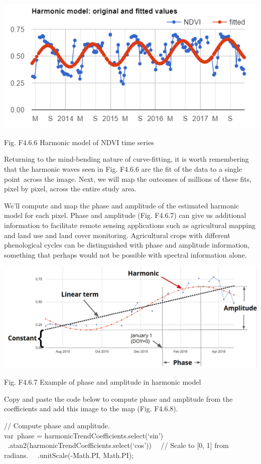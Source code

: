 \documentclass[
  letterpaper,
  DIV=11,
  numbers=noendperiod]{scrreprt}
\begin{document}
\includegraphics{./F4/image86.png}

Fig. F4.6.6 Harmonic model of NDVI time series

Returning to the mind-bending nature of curve-fitting, it is worth
remembering that the harmonic waves seen in Fig. F4.6.6 are the fit of
the data to a single point~across the image. Next, we will map the
outcomes of millions of these fits, pixel by pixel, across the entire
study area.

We'll compute and map the phase and amplitude of the estimated harmonic
model for each pixel. Phase and amplitude (Fig. F4.6.7) can give us
additional information to facilitate remote sensing applications such as
agricultural mapping and land use and land cover monitoring.
Agricultural crops with different phenological cycles can be
distinguished with phase and amplitude information, something that
perhaps would not be possible with spectral information alone.

\includegraphics{./F4/image8.png}

Fig. F4.6.7 Example of phase and amplitude in harmonic model

Copy and paste the code below to compute phase and amplitude from the
coefficients and add this image to the map (Fig. F4.6.8).

// Compute phase and amplitude.\\
var~phase = harmonicTrendCoefficients.select(`sin')\\
\hspace*{0.333em} ~.atan2(harmonicTrendCoefficients.select(`cos'))~ ~//
Scale to {[}0, 1{]} from radians.~ ~.unitScale(-Math.PI, Math.PI);
\end{document}
